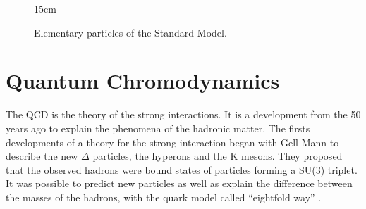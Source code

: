 \begin{figure}[!htm]{15cm} %
\caption{Elementary particles of the Standard Model.}%
\label{fig:standard_model}
\end{figure}

\section{Quantum Chromodynamics}\label{sec:QCD}

The QCD is the theory of the strong interactions. It is a development from the 50 years ago to explain the phenomena of the hadronic matter. The firsts developments of a theory for the strong interaction began with Gell-Mann to describe the new $\Delta$ particles, the hyperons and the K mesons. They proposed that the observed hadrons were bound states of particles forming a SU(3) triplet. It was possible to predict new particles as well as explain the difference between the masses of the hadrons, with the quark model called ``eightfold way'' \cite{osti_4008239}.

